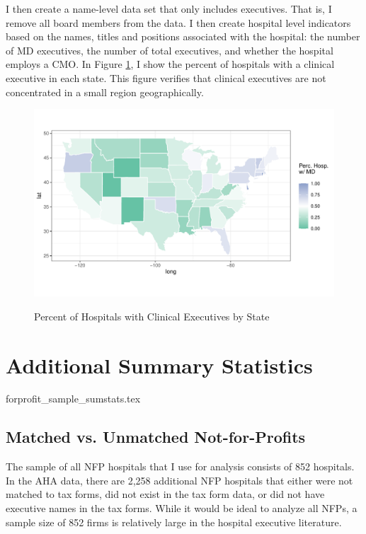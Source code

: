 \documentclass[12pt]{article}
\begin{document}
I then create a name-level data set that only includes executives. That is, I remove all board members from the data. I then create hospital level indicators based on the names, titles and positions associated with the hospital: the number of MD executives, the number of total executives, and whether the hospital employs a CMO. In Figure \ref{fig:state_doc}, I show the percent of hospitals with a clinical executive in each state. This figure verifies that clinical executives are not concentrated in a small region geographically. 

\begin{figure}[ht!]
    \centering
    \caption{Percent of Hospitals with Clinical Executives by State}
    \includegraphics[width=\textwidth]{Objects/has_doc_avg_map.pdf}
    \label{fig:state_doc}
\end{figure}

\section{Additional Summary Statistics}\label{app:sumstats}

{forprofit_sample_sumstats.tex}

\subsection{Matched vs. Unmatched Not-for-Profits}\label{app:matched}

The sample of all NFP hospitals that I use for analysis consists of 852 hospitals. In the AHA data, there are 2,258 additional NFP hospitals that either were not matched to tax forms, did not exist in the tax form data, or did not have executive names in the tax forms. While it would be ideal to analyze all NFPs, a sample size of 852 firms is relatively large in the hospital executive literature. 
\end{document}
